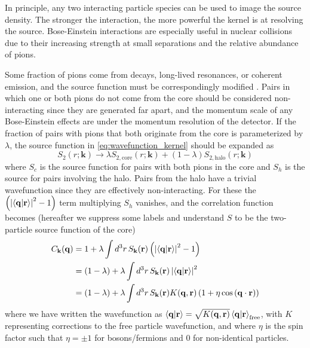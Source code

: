 In principle, any two interacting particle species can be used to image the source density.
The stronger the interaction, the more powerful the kernel is at resolving the source.
Bose-Einstein interactions are especially useful in nuclear collisions due to their increasing strength at small separations and the relative abundance of pions.

Some fraction of pions come from decays, long-lived resonances, or coherent emission, and the source function must be correspondingly modified \cite{Bowler:1991vx,Sinyukov:1998fc}.
Pairs in which one or both pions do not come from the core should be considered non-interacting since they are generated far apart, and the momentum scale of any Bose-Einstein effects are under the momentum resolution of the detector.
If the fraction of pairs with pions that both originate from the core is parameterized by $\lambda$, the source function in \cref{eq:wavefunction_kernel} should be expanded as
\begin{equation} S_{2}(r;\mathbf{k}) \rightarrow \lambda S_{2,\textrm{core}} (r;\mathbf{k}) + (1-\lambda) S_{2,\textrm{halo}} (r;\mathbf{k}) \end{equation}
where $S_c$ is the source function for pairs with both pions in the core and $S_h$ is the source for pairs involving the halo.
Pairs from the halo have a trivial wavefunction since they are effectively non-interacting.
For these the $\left(\left|\braket{\mathbf{q}|\mathbf{r}}\right|^2 - 1\right)$ term multiplying $S_h$ vanishes, and the correlation function becomes (hereafter we suppress some labels and understand $S$ to be the two-particle source function of the core)
\begin{equation}
  \begin{split}
    C_\mathbf{k}(\mathbf{q}) &= 1 + \lambda \int d^3 r \, S_{\mathbf{k}}(\mathbf{r}) \left(\left|\braket{\mathbf{q}|\mathbf{r}}\right|^2 - 1 \right)\\
    &= (1-\lambda) + \lambda \int d^3 r \, S_{\mathbf{k}}(\mathbf{r}) \left|\braket{\mathbf{q}|\mathbf{r}}\right|^2\\
    &= (1-\lambda) + \lambda \int d^3 r \, S_{\mathbf{k}}(\mathbf{r}) K(\mathbf{q},\mathbf{r}) \left(1 + \eta \cos\left(\mathbf{q}\cdot\mathbf{r}\right)\right)
  \end{split}
\end{equation}
where we have written the wavefunction as $\braket{\mathbf{q}|\mathbf{r}} = \sqrt{K(\mathbf{q},\mathbf{r})} \braket{\mathbf{q}|\mathbf{r}}_{\textrm{free}}$, with $K$ representing corrections to the free particle wavefunction, and where $\eta$ is the spin factor such that $\eta = \pm 1$ for bosons/fermions and $0$ for non-identical particles.
